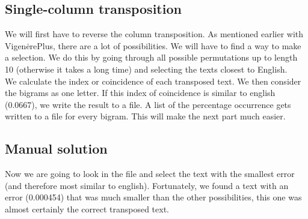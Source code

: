 \documentclass{article}
\begin{document}
\subsection{Single-column transposition}
We will first have to reverse the column transposition. As mentioned earlier with VigenėrePlus, there are a lot of possibilities. We will have to find a way to make a selection. We do this by going through all possible permutations up to length 10 (otherwise it takes a long time) and selecting the texts closest to English.\\

We calculate the index or coincidence of each transposed text. We then consider the bigrams as one letter. If this index of coincidence is similar to english (0.0667), we write the result to a file. A list of the percentage occurrence gets written to a file for every bigram. This will make the next part much easier.
\subsection{Manual solution}
Now we are going to look in the file and select the text with the smallest error (and therefore most similar to english). Fortunately, we found a text with an error (0.000454) that was much smaller than the other possibilities, this one was almost certainly the correct transposed text.\\
\end{document}

